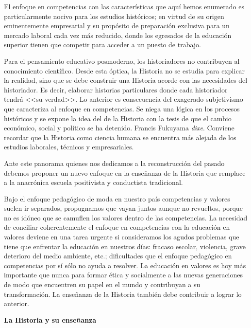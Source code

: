 El enfoque en competencias con las características que aquí hemos 
enumerado es particularmente nocivo para los estudios históricos; en 
virtud de su origen eminentemente empresarial y su propósito de 
preparación exclusiva para un mercado laboral cada vez más reducido, 
donde los egresados  de la educación superior tienen que competir para 
acceder a un puesto de trabajo.

Para el pensamiento educativo posmoderno, los historiadores no 
contribuyen al conocimiento científico. Desde esta óptica, la Historia 
no se estudia para explicar la realidad, sino que se debe construir una 
Historia acorde con las necesidades del historiador. Es decir, elaborar 
historias particulares donde cada historiador tendrá <<su verdad>>. Lo 
anterior es consecuencia del exagerado subjetivismo que caracteriza al 
enfoque en competencias. Se niega una lógica en los procesos históricos 
y se expone la idea del de la Historia con la tesis de que el cambio 
económico, social y político se ha detenido. Francis Fukuyama 
\textit{dixe}. Conviene recordar que la Historia  como ciencia humana 
se encuentra más alejada  de los estudios laborales, técnicos y 
empresariales.

Ante este panorama quienes nos dedicamos a la reconstrucción del pasado 
debemos proponer un nuevo enfoque en la enseñanza de la Historia que 
remplace a la anacrónica escuela positivista y conductista tradicional.

Bajo el enfoque pedagógico de moda en nuestro país competencias y 
valores suelen ir separados, propugnamos que vayan juntos aunque no 
revueltos, porque no es idóneo que se camuflen los valores dentro de 
las competencias. La necesidad de conciliar coherentemente el enfoque 
en competencias con la educación en valores deviene en una tarea 
urgente si consideramos los agudos problemas que tiene que enfrentar la 
educación en nuestros días: fracaso escolar, violencia, grave deterioro 
del medio ambiente, etc.; dificultades que el enfoque pedagógico en 
competencias por sí sólo no ayuda a resolver. La educación en valores 
es hoy más importante que nunca para formar ética y socialmente a las 
nuevas generaciones de modo que encuentren su papel en el mundo y 
contribuyan a su transformación. La enseñanza de la Historia también 
debe contribuir a lograr lo anterior.  


\medskip
{\bfseries La Historia y su enseñanza }

